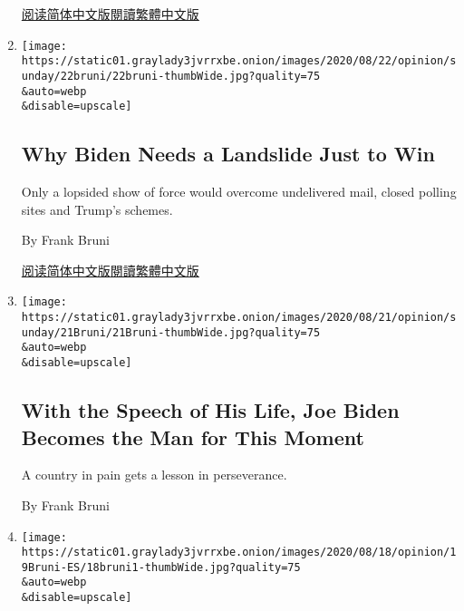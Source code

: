 \begin{enumerate}
  \href{https://cn.nytimes3xbfgragh.onion/opinion/20200827/trump-melania-rnc/}{阅读简体中文版}\href{https://cn.nytimes3xbfgragh.onion/opinion/20200827/trump-melania-rnc/zh-hant/}{閱讀繁體中文版}
\item
  \href{/2020/08/22/opinion/sunday/trump-cheat-biden-2020.html}{}

  \texttt{[image: https://static01.graylady3jvrrxbe.onion/images/2020/08/22/opinion/sunday/22bruni/22bruni-thumbWide.jpg?quality=75\\\&auto=webp\\\&disable=upscale]}

  \hypertarget{why-biden-needs-a-landslide-just-to-win}{%
  \subsection{Why Biden Needs a Landslide Just to
  Win}\label{why-biden-needs-a-landslide-just-to-win}}

  Only a lopsided show of force would overcome undelivered mail, closed
  polling sites and Trump's schemes.

  By Frank Bruni

  \href{https://cn.nytimes3xbfgragh.onion/opinion/20200824/trump-cheat-biden-2020/}{阅读简体中文版}\href{https://cn.nytimes3xbfgragh.onion/opinion/20200824/trump-cheat-biden-2020/zh-hant/}{閱讀繁體中文版}
\item
  \href{/2020/08/21/opinion/joe-biden-speech.html}{}

  \texttt{[image: https://static01.graylady3jvrrxbe.onion/images/2020/08/21/opinion/sunday/21Bruni/21Bruni-thumbWide.jpg?quality=75\\\&auto=webp\\\&disable=upscale]}

  \hypertarget{with-the-speech-of-his-life-joe-biden-becomes-the-man-for-this-moment}{%
  \subsection{With the Speech of His Life, Joe Biden Becomes the Man for
  This
  Moment}\label{with-the-speech-of-his-life-joe-biden-becomes-the-man-for-this-moment}}

  A country in pain gets a lesson in perseverance.

  By Frank Bruni
\item
  \href{/es/2020/08/19/espanol/opinion/michelle-obama-discurso.html}{}

  \texttt{[image: https://static01.graylady3jvrrxbe.onion/images/2020/08/18/opinion/19Bruni-ES/18bruni1-thumbWide.jpg?quality=75\\\&auto=webp\\\&disable=upscale]}

  \hypertarget{comentario}{%
}
\end{enumerate}

